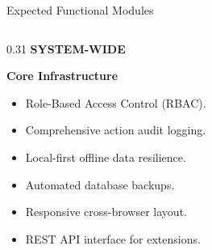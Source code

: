 \documentclass[aspectratio=169,10pt]{beamer}
\begin{document}
\begin{frame}{Expected Functional Modules}
\begin{columns}[T]
  \begin{column}{0.31\textwidth}
    {\fontsize{7pt}{8.5pt}\selectfont\bfseries\color{SubText} SYSTEM-WIDE}\par\vspace{2pt}
    {\fontsize{9.5pt}{11.5pt}\selectfont\bfseries\color{DarkText} Core Infrastructure}\par\vspace{4pt}
    {\fontsize{7.2pt}{9.2pt}\selectfont\color{DarkText}
    \begin{itemize}
      \item Role-Based Access Control (RBAC).
      \item Comprehensive action audit logging.
      \item Local-first offline data resilience.
      \item Automated database backups.
      \item Responsive cross-browser layout.
      \item REST API interface for extensions.
    \end{itemize}}
  \end{column}
\end{columns}
\end{frame}
\end{document}
